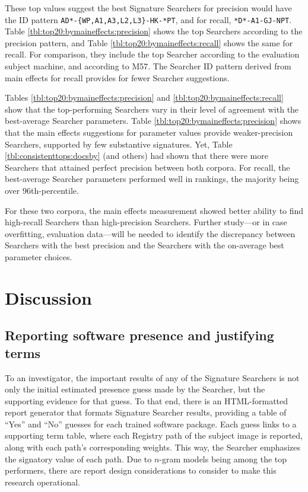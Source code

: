 \documentclass[11pt]{ucthesis}
\theoremstyle{plain}
\theoremstyle{definition}
\begin{document}
These top values suggest the best Signature Searchers for precision would have the ID pattern \texttt{AD*-\{WP,A1,A3,L2,L3\}-HK-*PT}, and for recall, \texttt{*D*-A1-GJ-NPT}.  Table \ref{tbl:top20:bymaineffects:precision} shows the top Searchers according to the precision pattern, and Table \ref{tbl:top20:bymaineffects:recall} shows the same for recall.  For comparison, they include the top Searcher according to the evaluation subject machine, and according to M57.  The Searcher ID pattern derived from main effects for recall provides for fewer Searcher suggestions.

Tables \ref{tbl:top20:bymaineffects:precision} and \ref{tbl:top20:bymaineffects:recall} show that the top-performing Searchers vary in their level of agreement with the best-average Searcher parameters.  Table \ref{tbl:top20:bymaineffects:precision} shows that the main effects suggestions for parameter values provide weaker-precision Searchers, supported by few substantive signatures.  Yet, Table \ref{tbl:consistenttops:docsby} (and others) had shown that there were more Searchers that attained perfect precision between both corpora.  For recall, the best-average Searcher parameters performed well in rankings, the majority being over 96th-percentile.

For these two corpora, the main effects measurement showed better ability to find high-recall Searchers than high-precision Searchers.  Further study---or in case overfitting, evaluation data---will be needed to identify the discrepancy between Searchers with the best precision and the Searchers with the on-average best parameter choices.


\section{Discussion}


\subsection{Reporting software presence and justifying terms}
\label{sec:searcherreport}

To an investigator, the important results of any of the Signature Searchers is not only the initial estimated presence guess made by the Searcher, but the supporting evidence for that guess.  To that end, there is an HTML-formatted report generator that formats Signature Searcher results, providing a table of ``Yes'' and ``No'' guesses for each trained software package.  Each guess links to a supporting term table, where each Registry path of the subject image is reported, along with each path's corresponding weights.  This way, the Searcher emphasizes the signatory value of each path.  Due to $n$-gram models being among the top performers, there are report design considerations to consider to make this research operational.
\end{document}
